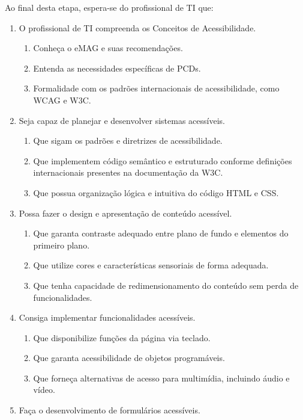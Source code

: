 \documentclass[
  12pt,
  openright,
  twoside,
  a4paper,
  english,
  french,
  spanish,
  brazil
]{abntex2}
\begin{document}
Ao final desta etapa, espera-se do profissional de TI que:

\begin{enumerate}
  \item O profissional de TI compreenda os Conceitos de Acessibilidade.
  \begin{enumerate}
    \item Conheça o eMAG e suas recomendações.
    \item Entenda as necessidades específicas de PCDs.
    \item
      Formalidade com os padrões internacionais de acessibilidade, como WCAG e
      W3C.
  \end{enumerate}
  \item Seja capaz de planejar e desenvolver sistemas acessíveis.
  \begin{enumerate}
    \item Que sigam os padrões e diretrizes de acessibilidade.
    \item
      Que implementem código semântico e estruturado conforme definições
      internacionais presentes na documentação da W3C.
    \item Que possua organização lógica e intuitiva do código HTML e CSS.
  \end{enumerate}
  \item Possa fazer o design e apresentação de conteúdo acessível.
  \begin{enumerate}
    \item
      Que garanta contraste adequado entre plano de fundo e elementos do
      primeiro plano.
    \item Que utilize cores e características sensoriais de forma adequada.
    \item
      Que tenha capacidade de redimensionamento do conteúdo sem perda de
      funcionalidades.
  \end{enumerate}
  \item Consiga implementar funcionalidades acessíveis.
  \begin{enumerate}
    \item Que disponibilize funções da página via teclado.
    \item Que garanta acessibilidade de objetos programáveis.
    \item
      Que forneça alternativas de acesso para multimídia, incluindo áudio e
      vídeo.
  \end{enumerate}
  \item Faça o desenvolvimento de formulários acessíveis.

\end{enumerate}
\end{document}
